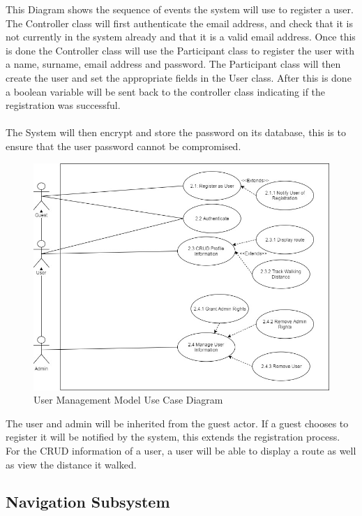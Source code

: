 \documentclass{article}
\begin{document}
			    {This Diagram shows the sequence of events the system will use to register a user. The Controller class will first authenticate the email address, and check that it is not currently in the system already and that it is a valid email address. Once this is done the Controller class will use the Participant class to register the user with a name, surname, email address and password. The Participant class will then create the user and set the appropriate fields in the User class. After this is done a boolean variable will be sent back to the controller class indicating if the registration was successful.\\\\
			    The System will then encrypt and store the password on its database, this is to ensure that the user password cannot be compromised.}
			    \begin{figure}[H]
                    \centering \includegraphics[height=0.55\textheight]{UMM-Diagrams/UMMUseCase}
                     \caption{User Management Model Use Case Diagram}
					 \label{fig:user_usecase}
			    \end{figure}
			    {The user and admin will be inherited from the guest actor. If a guest chooses to register it will be notified by the system, this extends the registration process. For the CRUD information of a user, a user will be able to display a route as well as view the distance it walked.}
			    
			\subsection{Navigation Subsystem}\label{subsec:navigation}
			
\end{document}
